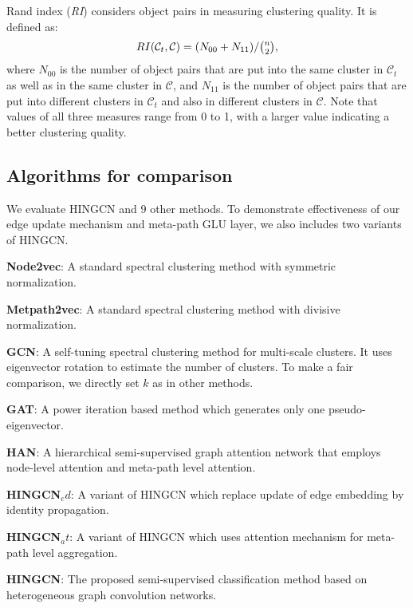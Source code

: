 {Rand index ({\it RI}) considers object pairs in measuring clustering quality. It is defined as:
\begin{equation}
RI(\mathcal{C}_t,\mathcal{C}) = (N_{00} + N_{11}) / {\tbinom n2},
\end{equation}
where $N_{00}$ is the number of object pairs that are put into the same cluster in $\mathcal{C}_t$
as well as in the same cluster in $\mathcal{C}$, and
$N_{11}$ is the number of object pairs that are put into different clusters in 
$\mathcal{C}_t$ and also in different clusters in $\mathcal{C}$.
Note that values of all three measures range from 0 to 1, with a larger value indicating a better
clustering quality. 
}

\subsection{Algorithms for comparison}
\label{sec:algo-comp}
We evaluate HINGCN and 9 other methods. To demonstrate effectiveness of our edge update mechanism and meta-path GLU layer, we also includes two variants of HINGCN.

\noindent{\small$\bullet$}
\textbf{Node2vec}: A standard spectral clustering method with symmetric normalization.

\noindent{\small$\bullet$}
\textbf{Metpath2vec}: A standard spectral clustering method with divisive normalization.

\noindent{\small$\bullet$}
\textbf{GCN}: A self-tuning spectral clustering method for multi-scale clusters.
It uses eigenvector rotation to estimate the number of clusters.
To make a fair comparison, we directly set $k$ as in other methods.

\noindent{\small$\bullet$}
\textbf{GAT}: A power iteration based method which generates only one pseudo-eigenvector.

\noindent{\small$\bullet$}
\textbf{HAN}:
A hierarchical semi-supervised graph attention network that employs node-level attention and meta-path level attention.

\noindent{\small$\bullet$}
\textbf{HINGCN$_ed$}: 
A variant of HINGCN which replace update of edge embedding by identity propagation.

\noindent{\small$\bullet$}
\textbf{HINGCN$_at$}:
A variant of HINGCN which uses attention mechanism for meta-path level aggregation.

\noindent{\small$\bullet$}
\textbf{HINGCN}:
The proposed semi-supervised classification method based on heterogeneous graph convolution networks.


